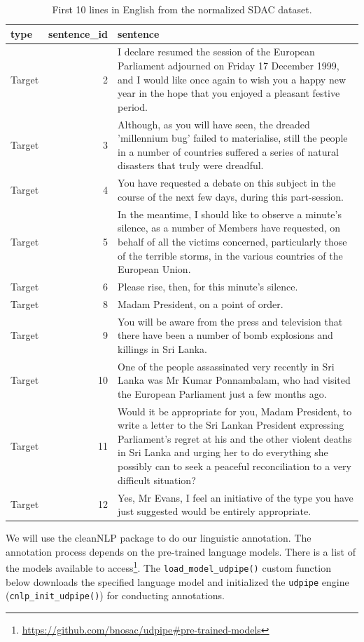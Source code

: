 \documentclass[
]{article}
\DeclareRobustCommand{\href}[2]{#2\footnote{\url{#1}}}
\begin{document}
\begin{table}

\caption{\label{tab:unnamed-chunk-3}First 10 lines in English from the normalized SDAC dataset.}
\centering
\begin{tabular}[t]{lrl}
\toprule
type & sentence\_id & sentence\\
\midrule
Target & 2 & I declare resumed the session of the European Parliament adjourned on Friday 17 December 1999, and I would like once again to wish you a happy new year in the hope that you enjoyed a pleasant festive period.\\
Target & 3 & Although, as you will have seen, the dreaded 'millennium bug' failed to materialise, still the people in a number of countries suffered a series of natural disasters that truly were dreadful.\\
Target & 4 & You have requested a debate on this subject in the course of the next few days, during this part-session.\\
Target & 5 & In the meantime, I should like to observe a minute's silence, as a number of Members have requested, on behalf of all the victims concerned, particularly those of the terrible storms, in the various countries of the European Union.\\
Target & 6 & Please rise, then, for this minute's silence.\\
\addlinespace
Target & 8 & Madam President, on a point of order.\\
Target & 9 & You will be aware from the press and television that there have been a number of bomb explosions and killings in Sri Lanka.\\
Target & 10 & One of the people assassinated very recently in Sri Lanka was Mr Kumar Ponnambalam, who had visited the European Parliament just a few months ago.\\
Target & 11 & Would it be appropriate for you, Madam President, to write a letter to the Sri Lankan President expressing Parliament's regret at his and the other violent deaths in Sri Lanka and urging her to do everything she possibly can to seek a peaceful reconciliation to a very difficult situation?\\
Target & 12 & Yes, Mr Evans, I feel an initiative of the type you have just suggested would be entirely appropriate.\\
\bottomrule
\end{tabular}
\end{table}

We will use the cleanNLP package to do our linguistic annotation. The annotation process depends on the pre-trained language models. There is \href{https://github.com/bnosac/udpipe\#pre-trained-models}{a list of the models available to access}. The \texttt{load\_model\_udpipe()} custom function below downloads the specified language model and initialized the \texttt{udpipe} engine (\texttt{cnlp\_init\_udpipe()}) for conducting annotations.
\end{document}
